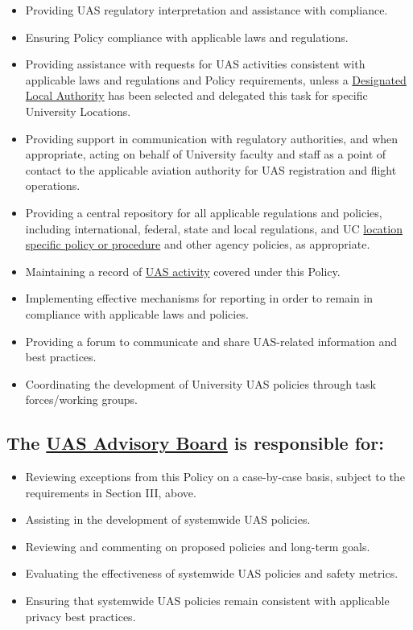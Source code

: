 \documentclass[
]{book}
\providecommand{\tightlist}{%
  \setlength{\itemsep}{0pt}\setlength{\parskip}{0pt}}
\begin{document}
\begin{itemize}
\tightlist
\item
  Providing UAS regulatory interpretation and assistance with compliance.
\item
  Ensuring Policy compliance with applicable laws and regulations.
\item
  Providing assistance with requests for UAS activities consistent with applicable laws and regulations and Policy requirements, unless a \protect\hyperlink{DLA}{Designated Local Authority} has been selected and delegated this task for specific University Locations.
\item
  Providing support in communication with regulatory authorities, and when appropriate, acting on behalf of University faculty and staff as a point of contact to the applicable aviation authority for UAS registration and flight operations.
\item
  Providing a central repository for all applicable regulations and policies, including international, federal, state and local regulations, and UC \protect\hyperlink{LSP}{location specific policy or procedure} and other agency policies, as appropriate.
\item
  Maintaining a record of \protect\hyperlink{UASactivity}{UAS activity} covered under this Policy.
\item
  Implementing effective mechanisms for reporting in order to remain in compliance with applicable laws and policies.
\item
  Providing a forum to communicate and share UAS-related information and best practices.
\item
  Coordinating the development of University UAS policies through task forces/working groups.
\end{itemize}

\hypertarget{the-refab-is-responsible-for}{%
\subsection{The \protect\hyperlink{AB}{UAS Advisory Board} is responsible for:}\label{the-refab-is-responsible-for}}

\begin{itemize}
\tightlist
\item
  Reviewing exceptions from this Policy on a case-by-case basis, subject to the requirements in Section III, above.
\item
  Assisting in the development of systemwide UAS policies.
\item
  Reviewing and commenting on proposed policies and long-term goals.
\item
  Evaluating the effectiveness of systemwide UAS policies and safety metrics.
\item
  Ensuring that systemwide UAS policies remain consistent with applicable privacy best practices.
\end{itemize}
\end{document}
